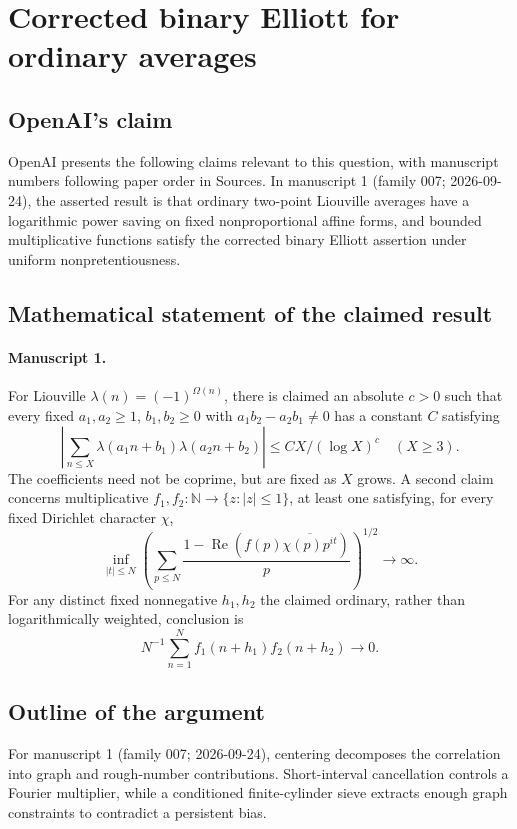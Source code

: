 \documentclass[11pt]{article}
\begin{document}
\section*{Corrected binary Elliott for ordinary averages}

\subsection{OpenAI's claim}
OpenAI presents the following claims relevant to this question, with manuscript numbers following paper order in Sources. In manuscript 1 (family 007; 2026-09-24), the asserted result is that ordinary two-point Liouville averages have a logarithmic power saving on fixed nonproportional affine forms, and bounded multiplicative functions satisfy the corrected binary Elliott assertion under uniform nonpretentiousness.

\subsection{Mathematical statement of the claimed result}
\paragraph{Manuscript 1.}
For Liouville $\lambda(n)=(-1)^{\Omega(n)}$, there is claimed an absolute $c>0$ such that every fixed $a_1,a_2\ge1$, $b_1,b_2\ge0$ with $a_1b_2-a_2b_1\ne0$ has a constant $C$ satisfying
\[
 |\sum_{n\le X}\lambda(a_1n+b_1)\lambda(a_2n+b_2)|\le C X/(\log X)^c\quad(X\ge3).
\]
The coefficients need not be coprime, but are fixed as $X$ grows. A second claim concerns multiplicative $f_1,f_2:\mathbb N\to\{z:|z|\le1\}$, at least one satisfying, for every fixed Dirichlet character $\chi$,
\[
 \inf_{|t|\le N}\left(\sum_{p\le N}\frac{1-\operatorname{Re}(f(p)\overline{\chi(p)p^{it}})}p\right)^{1/2}\longrightarrow\infty.
\]
For any distinct fixed nonnegative $h_1,h_2$ the claimed ordinary, rather than logarithmically weighted, conclusion is
\[
 N^{-1}\sum_{n=1}^Nf_1(n+h_1)f_2(n+h_2)\longrightarrow0.
\]

\subsection{Outline of the argument}
For manuscript 1 (family 007; 2026-09-24), centering decomposes the correlation into graph and rough-number contributions. Short-interval cancellation controls a Fourier multiplier, while a conditioned finite-cylinder sieve extracts enough graph constraints to contradict a persistent bias.
\end{document}

